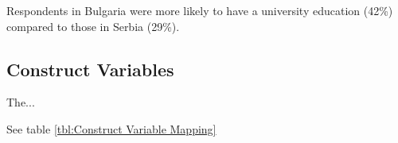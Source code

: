\documentclass{article}
\begin{document}
Respondents in Bulgaria were more likely to have a university education (42\%) compared to those in Serbia (29\%).



\subsection*{Construct Variables}

The...

See table \ref{tbl:Construct Variable Mapping}






% 
% 
\end{document}
